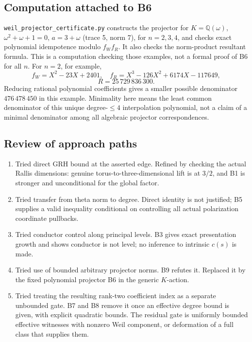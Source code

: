 \documentclass[11pt,a4paper]{article}
\providecommand{\tightlist}{\setlength{\itemsep}{0pt}\setlength{\parskip}{0pt}}
\theoremstyle{definition}
\begin{document}
\subsection{Computation attached to B6}\label{computation-attached-to-b6}

\texttt{weil\_projector\_certificate.py} constructs the projector for \(K=\mathbb Q(\omega)\), \(\omega^2+\omega+1=0\), \(a=3+\omega\) (trace 5, norm 7), for \(n=2,3,4\), and checks exact polynomial idempotence modulo \(f_W f_R\). It also checks the norm-product resultant formula. This is a computation checking those examples, not a formal proof of B6 for all \(n\). For \(n=2\), for example, \[
 f_W=X^2-23X+2401,\quad f_R=X^3-126X^2+6174X-117649,
\] \[
 R=25\,729\,836\,300.
\] Reducing rational polynomial coefficients gives a smaller possible denominator \(476\,478\,450\) in this example. Minimality here means the least common denominator of this unique degree-\(\leq4\) interpolation polynomial, not a claim of a minimal denominator among all algebraic projector correspondences.

\subsection{Review of approach paths}\label{review-of-approach-paths}

\begin{enumerate}
\def\labelenumi{\arabic{enumi}.}
\tightlist
\item
  Tried direct GRH bound at the asserted edge. Refined by checking the actual Rallis dimensions: genuine torus-to-three-dimensional lift is at \(3/2\), and B1 is stronger and unconditional for the global factor.
\item
  Tried transfer from theta norm to degree. Direct identity is not justified; B5 supplies a valid inequality conditional on controlling all actual polarization coordinate pullbacks.
\item
  Tried conductor control along principal levels. B3 gives exact presentation growth and shows conductor is not level; no inference to intrinsic \(c(s)\) is made.
\item
  Tried use of bounded arbitrary projector norms. B9 refutes it. Replaced it by the fixed polynomial projector B6 in the generic \(K\)-action.
\item
  Tried treating the resulting rank-two coefficient index as a separate unbounded gate. B7 and B8 remove it once an effective degree bound is given, with explicit quadratic bounds. The residual gate is uniformly bounded effective witnesses with nonzero Weil component, or deformation of a full class that supplies them.
\end{enumerate}
\end{document}
